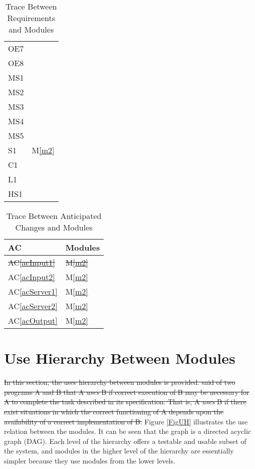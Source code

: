 \documentclass[12pt, titlepage]{article}
\newcommand{\acref}[1]{AC\ref{#1}}
\newcommand{\mref}[1]{M\ref{#1}}
\begin{document}
\begin{table}[H]
\begin{tabular}{p{} p{}}
        OE7 & ~\\
        OE8 & ~\\
        MS1 & ~\\
        MS2 & ~\\
        MS3 & ~\\
        MS4 & ~\\
        MS5 & ~\\
        S1 & \mref{m2}\\
        C1 & ~\\
        L1 & ~\\
        HS1 & ~\\
        \bottomrule
    \end{tabular}
    \caption{Trace Between Requirements and Modules}
    \label{TblRT}
\end{table}

\begin{table}[H]
    \centering
    \begin{tabular}{p{} p{}}
        \toprule
        \textbf{AC} & \textbf{Modules}\\
        \midrule
        \sout{\acref{acInput1}} & \sout{\mref{m2}}\\
        \acref{acInput2} & \mref{m2}\\
        \acref{acServer1} & \mref{m2}\\
        \acref{acServer2} & \mref{m2}\\
        \acref{acOutput} & \mref{m2}\\
        \bottomrule
    \end{tabular}
    \caption{Trace Between Anticipated Changes and Modules}
    \label{TblACT}
\end{table}

\section{Use Hierarchy Between Modules} \label{SecUse}

\sout{In this section, the uses hierarchy between modules is provided. \mbox{\citet{Parnas1978}} said of two programs A and B that A {\em uses} B if correct execution of B may be necessary for A to complete the task described in its specification. That is, A {\em uses} B if there exist situations in which the correct functioning of A depends upon the availability of a correct implementation of B.}
Figure \ref{FigUH} illustrates the use relation between the modules. It can be seen that the graph is a directed acyclic graph (DAG). Each level of the hierarchy offers a testable and usable subset of the system, and modules in the higher level of the hierarchy are essentially simpler because they use modules from the lower levels.
\end{document}
